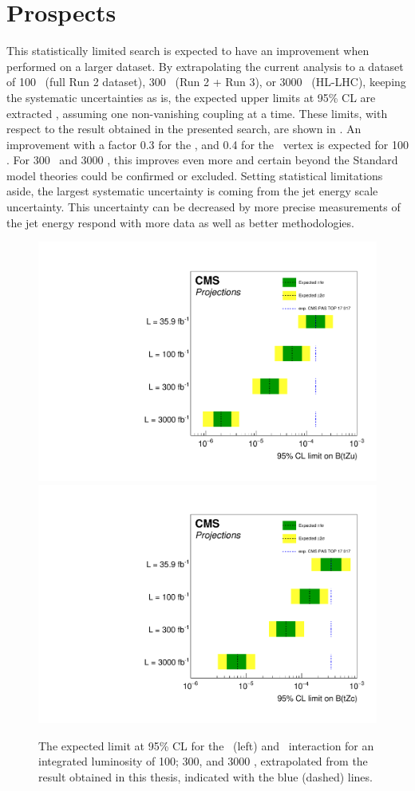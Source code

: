 \section{Prospects}
This statistically limited search is expected to have an improvement when performed on a larger dataset. By extrapolating the current analysis to a dataset of 100 \fbinv\ (full Run 2 dataset), 300 \fbinv\ (Run 2 + Run 3), or 3000 \fbinv\ (HL-LHC), keeping the systematic uncertainties as is,  the expected upper limits at 95\% CL are  extracted %
, assuming one non-vanishing coupling at a time. These limits, with respect to the result obtained in the presented search, are shown in .  An improvement with a factor 0.3 for the \Zut, and 0.4 for the \Zct\ vertex is expected for 100 \fbinv. For 300 \fbinv\ and 3000 \fbinv, this improves even more and certain beyond the Standard model theories could be confirmed or excluded. Setting statistical limitations aside, the largest systematic uncertainty is coming from the jet energy scale uncertainty. This uncertainty can be decreased by more precise measurements of the jet energy respond with more data as well as better methodologies. %
\begin{figure}
	\centering
	\includegraphics[width=0.49\linewidth]{7_Conclusion/Figures/TOP-17-017_limitsZutProj.pdf}
	\includegraphics[width=0.49\linewidth]{7_Conclusion/Figures/TOP-17-017_limitsZctproj.pdf}
	\caption{The expected limit at 95\% CL for the \Zut\ (left) and \Zct\ interaction for an integrated luminosity of 100; 300, and 3000 \fbinv, extrapolated from the result obtained in this thesis, indicated with the blue (dashed) lines. }
	\label{fig:proj} %
\end{figure}


